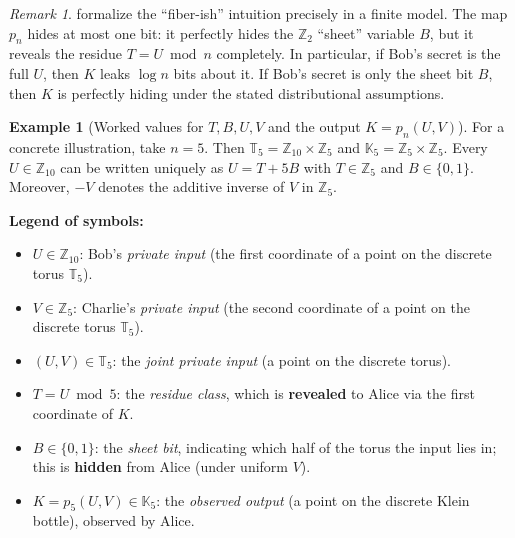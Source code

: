 \documentclass[11pt,a4paper]{article}
\theoremstyle{definition}
\newtheorem{example}[theorem]{Example}
\theoremstyle{remark}
\newtheorem{remark}[theorem]{Remark}
\begin{document}
\begin{remark}
\label{rem:interpretation}
 formalize the ``fiber-ish'' intuition precisely in a finite model. The map \(p_n\) hides at most one bit: it perfectly hides the \(\mathbb{Z}_2\) ``sheet'' variable \(B\), but it reveals the residue \(T=U\bmod n\) completely. In particular, if Bob's secret is the full \(U\), then \(K\) leaks \(\log n\) bits about it. If Bob's secret is only the sheet bit \(B\), then \(K\) is perfectly hiding under the stated distributional assumptions.
\end{remark}

\begin{example}[Worked values for \(T,B,U,V\) and the output \(K=p_n(U,V)\)]
\label{ex:table-t-b-u-v}
For a concrete illustration, take \(n=5\). Then \(\mathbb{T}_5=\mathbb{Z}_{10}\times\mathbb{Z}_5\) and \(\mathbb{K}_5=\mathbb{Z}_5\times\mathbb{Z}_5\). Every \(U\in\mathbb{Z}_{10}\) can be written uniquely as \(U=T+5B\) with \(T\in\mathbb{Z}_5\) and \(B\in\{0,1\}\). Moreover, \(-V\) denotes the additive inverse of \(V\) in \(\mathbb{Z}_5\).

\medskip
\noindent\textbf{Legend of symbols:}
\begin{itemize}
  \item \(U\in\mathbb{Z}_{10}\): Bob's \emph{private input} (the first coordinate of a point on the discrete torus \(\mathbb{T}_5\)).
  \item \(V\in\mathbb{Z}_5\): Charlie's \emph{private input} (the second coordinate of a point on the discrete torus \(\mathbb{T}_5\)).
  \item \((U,V)\in\mathbb{T}_5\): the \emph{joint private input} (a point on the discrete torus).
  \item \(T=U\bmod 5\): the \emph{residue class}, which is \textbf{revealed} to Alice via the first coordinate of \(K\).
  \item \(B\in\{0,1\}\): the \emph{sheet bit}, indicating which half of the torus the input lies in; this is \textbf{hidden} from Alice (under uniform \(V\)).
  \item \(K=p_5(U,V)\in\mathbb{K}_5\): the \emph{observed output} (a point on the discrete Klein bottle), observed by Alice.
\end{itemize}


\end{example}
\end{document}
